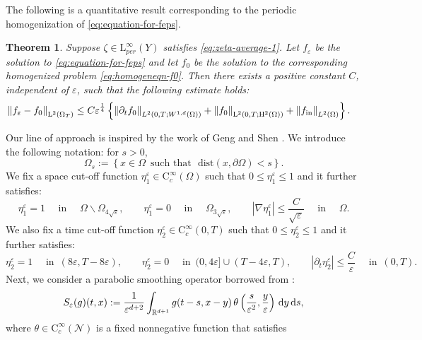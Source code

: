 \documentclass[preprint, 12pt]{amsart}
\numberwithin{equation}{section}
\newtheorem{theorem}{Theorem}[section]
\numberwithin{equation}{section}
\newcommand\RR{\mathbb{R}}
\newcommand{\eps}{\varepsilon}
\begin{document}
The following is a quantitative result corresponding to the periodic homogenization of \eqref{eq:equation-for-feps}.
\begin{theorem}\label{thm:homogen-feps}
Suppose $\zeta \in \mathrm L_{per}^{\infty}(Y)$ satisfies \eqref{eq:zeta-average-1}.
Let $f_{\eps}$ be the solution to \eqref{eq:equation-for-feps} and let $f_0$ be the solution to the corresponding homogenized problem \eqref{eq:homogeneqn-f0}. Then there exists a positive constant $C$, independent of $\varepsilon$, such that the following estimate holds:
\begin{equation}\label{eq:L2-estimate}
\begin{aligned}
\left\Vert f_\eps - f_0 \right\Vert_{\mathrm L^2(\Omega_T)} 
&  \le C \eps^{\frac14} \left\{ \left\Vert \partial_tf_0\right\Vert_{L^2(0,T;W^{1,d}(\Omega))} + \left\Vert f_0\right\Vert_{\mathrm L^2(0,T;\mathrm H^2(\Omega))} + \left\Vert f_{{\rm{in}}}\right\Vert_{L^2(\Omega)} \right\}.
\end{aligned}
\end{equation}
\end{theorem}
Our line of approach is inspired by the work of Geng and Shen \cite{geng2017convergence}. We introduce the following notation: for $s>0$,
\[
\Omega_s := \left\{ x\in \Omega \, \mbox{ such that }\mbox{ dist}(x,\partial\Omega)<s\right\}.
\]
We fix a space cut-off function $\eta_1^\eps \in \mathrm{C}_c^{\infty}(\Omega)$ such that $0\leq \eta_1^\eps \leq 1$ and it further satisfies:
\[
\eta_1^\eps = 1 \quad \mbox{ in }\quad \Omega \backslash \Omega_{4\sqrt{\varepsilon}},
\qquad
\eta_1^\eps = 0 \quad \mbox{ in }\quad \Omega_{3\sqrt{\varepsilon}},
\qquad
\left\vert\nabla \eta_1^\eps \right\vert \leq \frac{C}{\sqrt{\eps}} \quad \mbox{ in }\quad \Omega.
\]
We also fix a time cut-off function $\eta_2^\eps \in \mathrm{C}_c^\infty(0,T)$ such that $0\leq \eta_2^\eps \leq 1$ and it further satisfies:
\[
\eta_2^\eps = 1 \quad \mbox{ in }\, \left(8\eps, T-8\eps\right),
\qquad
\eta_2^\eps = 0 \quad \mbox{ in }\, (0,4\eps]\cup(T-4\eps,T),
\qquad 
\left\vert \partial_t \eta_2^\eps\right\vert \leq \frac{C}{\eps} \quad \mbox{ in }\, (0,T).
\]
Next, we consider a parabolic smoothing operator borrowed from \cite[Section 3, p.2102]{geng2017convergence}:
\begin{equation}\label{eq:smoothing-op}
S_\eps(g)(t,x) := \frac{1}{\eps^{d+2}} \int_{\RR^{d+1}} g(t-s,x-y)\, \theta\left(\frac{s}{\eps^2}, \frac{y}{\eps}\right)\, {\rm d}y\, {\rm d}s,
\end{equation}
where $\theta\in \mathrm C^\infty_c(\mathcal{N})$ is a fixed nonnegative function that satisfies
\end{document}
